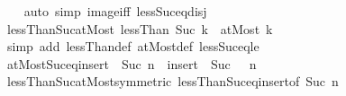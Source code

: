 \begin{isabellebody}
%
\isadelimproof
\ \ %
\endisadelimproof
%
\isatagproof
{}\isamarkupfalse%
\ {\isacharparenleft}{\kern0pt}auto\ simp{\isacharcolon}{\kern0pt}\ image{\isacharunderscore}{\kern0pt}iff\ less{\isacharunderscore}{\kern0pt}Suc{\isacharunderscore}{\kern0pt}eq{\isacharunderscore}{\kern0pt}{}{\isacharunderscore}{\kern0pt}disj{\isacharparenright}{\kern0pt}%
\endisatagproof
{\isafoldproof}%
%
\isadelimproof
\isanewline
%
\endisadelimproof
\isanewline
{}\isamarkupfalse%
\ lessThan{\isacharunderscore}{\kern0pt}Suc{\isacharunderscore}{\kern0pt}atMost{\isacharcolon}{\kern0pt}\ {\isachardoublequoteopen}lessThan\ {\isacharparenleft}{\kern0pt}Suc\ k{\isacharparenright}{\kern0pt}\ {\isacharequal}{\kern0pt}\ atMost\ k{\isachardoublequoteclose}\isanewline
%
\isadelimproof
%
\endisadelimproof
%
\isatagproof
{}\isamarkupfalse%
\ {\isacharparenleft}{\kern0pt}simp\ add{\isacharcolon}{\kern0pt}\ lessThan{\isacharunderscore}{\kern0pt}def\ atMost{\isacharunderscore}{\kern0pt}def\ less{\isacharunderscore}{\kern0pt}Suc{\isacharunderscore}{\kern0pt}eq{\isacharunderscore}{\kern0pt}le{\isacharparenright}{\kern0pt}%
\endisatagproof
{\isafoldproof}%
%
\isadelimproof
\isanewline
%
\endisadelimproof
\isanewline
{}\isamarkupfalse%
\ atMost{\isacharunderscore}{\kern0pt}Suc{\isacharunderscore}{\kern0pt}eq{\isacharunderscore}{\kern0pt}insert{\isacharunderscore}{\kern0pt}{}{\isacharcolon}{\kern0pt}\ {\isachardoublequoteopen}{\isacharbraceleft}{\kern0pt}{\isachardot}{\kern0pt}{\isachardot}{\kern0pt}\ Suc\ n{\isacharbraceright}{\kern0pt}\ {\isacharequal}{\kern0pt}\ insert\ {}\ {\isacharparenleft}{\kern0pt}Suc\ {\isacharbackquote}{\kern0pt}\ {\isacharbraceleft}{\kern0pt}{\isachardot}{\kern0pt}{\isachardot}{\kern0pt}\ n{\isacharbraceright}{\kern0pt}{\isacharparenright}{\kern0pt}{\isachardoublequoteclose}\isanewline
%
\isadelimproof
\ \ %
\endisadelimproof
%
\isatagproof
{}\isamarkupfalse%
\ lessThan{\isacharunderscore}{\kern0pt}Suc{\isacharunderscore}{\kern0pt}atMost{\isacharbrackleft}{\kern0pt}symmetric{\isacharbrackright}{\kern0pt}\ lessThan{\isacharunderscore}{\kern0pt}Suc{\isacharunderscore}{\kern0pt}eq{\isacharunderscore}{\kern0pt}insert{\isacharunderscore}{\kern0pt}{}{\isacharbrackleft}{\kern0pt}of\ {\isachardoublequoteopen}Suc\ n{\isachardoublequoteclose}{\isacharbrackright}{\kern0pt}\ \isacommand{{\isachardot}{\kern0pt}{\isachardot}{\kern0pt}}\isamarkupfalse%
%
\endisatagproof
{\isafoldproof}%
%
\isadelimproof
\isanewline
%
\endisadelimproof
\isanewline
{}\isamarkupfalse%

\end{isabellebody}
